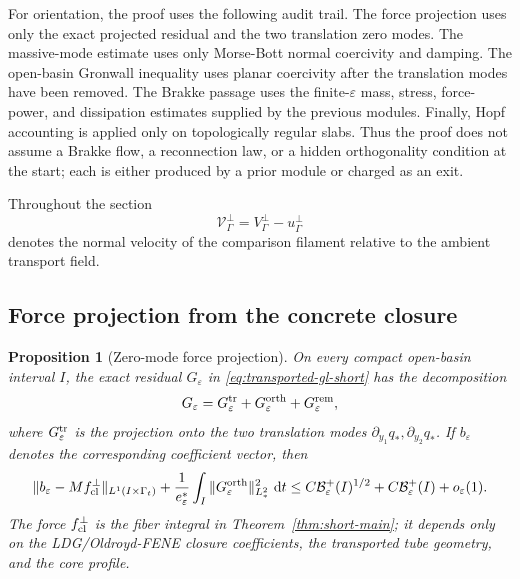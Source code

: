 \documentclass[11pt]{article}
\newtheorem{proposition}[theorem]{Proposition}
\theoremstyle{definition}
\newcommand{\dd}{\,\mathrm d}
\newcommand{\eps}{\varepsilon}
\newcommand{\estar}{e_\varepsilon^\ast}
\newcommand{\Basin}{\mathcal B}
\newcommand{\Vrel}{\mathcal V}
\begin{document}
For orientation, the proof uses the following audit trail.  The force projection
uses only the exact projected residual and the two translation zero modes.  The
massive-mode estimate uses only Morse-Bott normal coercivity and damping.  The
open-basin Gronwall inequality uses planar coercivity after the translation
modes have been removed.  The Brakke passage uses the finite-\(\eps\) mass,
stress, force-power, and dissipation estimates supplied by the previous modules.
Finally, Hopf accounting is applied only on topologically regular slabs.  Thus
the proof does not assume a Brakke flow, a reconnection law, or a hidden
orthogonality condition at the start; each is either produced by a prior module
or charged as an exit.

Throughout the section
\[
        \Vrel_\Gamma^\perp=V_\Gamma^\perp-u_\Gamma^\perp
\]
denotes the normal velocity of the comparison filament relative to the ambient
transport field.

\subsection{Force projection from the concrete closure}

\begin{proposition}[Zero-mode force projection]
\label{prop:short-force}
On every compact open-basin interval \(I\), the exact residual
\(G_\eps\) in \eqref{eq:transported-gl-short} has the decomposition
\[
        G_\eps
        =
        G_\eps^{\rm tr}
        +
        G_\eps^{\rm orth}
        +
        G_\eps^{\rm rem},
\]
where \(G_\eps^{\rm tr}\) is the projection onto the two translation modes
\(\partial_{y_1}q_\ast,\partial_{y_2}q_\ast\).  If \(b_\eps\) denotes the
corresponding coefficient vector, then
\[
        \|b_\eps-Mf_{\rm cl}^\perp\|_{L^1(I\times\Gamma_t)}
        +
        \frac{1}{\estar}
        \int_I\|G_\eps^{\rm orth}\|_{L_\ast^2}^2\,\dd t
        \le
        C\Basin_\eps^+(I)^{1/2}
        +
        C\Basin_\eps^+(I)
        +
        o_\eps(1).
\]
The force \(f_{\rm cl}^\perp\) is the fiber integral in
Theorem~\ref{thm:short-main}; it depends only on the LDG/Oldroyd-FENE closure
coefficients, the transported tube geometry, and the core profile.
\end{proposition}
\end{document}
